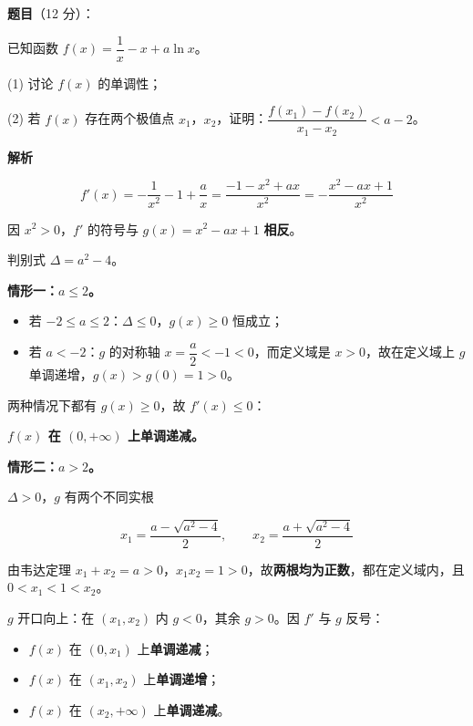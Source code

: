 \begin{answer}

\textbf{题目}（12 分）：

已知函数 $f(x)=\dfrac1x-x+a\ln x$。

  (1) 讨论 $f(x)$ 的单调性；

  (2) 若 $f(x)$ 存在两个极值点 $x_1$，$x_2$，证明：$\dfrac{f\left(x_1\right)-f\left(x_2\right)}{x_1-x_2}<a-2$。

\textbf{解析}


\nopagebreak[4]
\[f'(x)=-\frac1{x^{2}}-1+\frac ax=\frac{-1-x^{2}+ax}{x^{2}}=-\frac{x^{2}-ax+1}{x^{2}}\]

因 $x^{2}>0$，$f'$ 的符号与 $g(x)=x^{2}-ax+1$ \textbf{相反}。

判别式 $\Delta=a^{2}-4$。

\textbf{情形一：$a\le2$。}

\begin{itemize}
\item 若 $-2\le a\le2$：$\Delta\le0$，$g(x)\ge0$ 恒成立；
\item 若 $a<-2$：$g$ 的对称轴 $x=\dfrac a2<-1<0$，而定义域是 $x>0$，故在定义域上 $g$ 单调递增，$g(x)>g(0)=1>0$。
\end{itemize}

两种情况下都有 $g(x)\ge0$，故 $f'(x)\le0$：

\textbf{$f(x)$ 在 $(0,+\infty)$ 上单调递减。}

\textbf{情形二：$a>2$。}

$\Delta>0$，$g$ 有两个不同实根

\nopagebreak[4]
\[x_1=\frac{a-\sqrt{a^{2}-4}}2,\qquad x_2=\frac{a+\sqrt{a^{2}-4}}2\]

由韦达定理 $x_1+x_2=a>0$，$x_1x_2=1>0$，故\textbf{两根均为正数}，都在定义域内，且 $0<x_1<1<x_2$。

$g$ 开口向上：在 $\left(x_1,x_2\right)$ 内 $g<0$，其余 $g>0$。因 $f'$ 与 $g$ 反号：

\begin{itemize}
\item $f(x)$ 在 $\left(0,x_1\right)$ 上\textbf{单调递减}；
\item $f(x)$ 在 $\left(x_1,x_2\right)$ 上\textbf{单调递增}；
\item $f(x)$ 在 $\left(x_2,+\infty\right)$ 上\textbf{单调递减}。
\end{itemize}


\end{answer}
